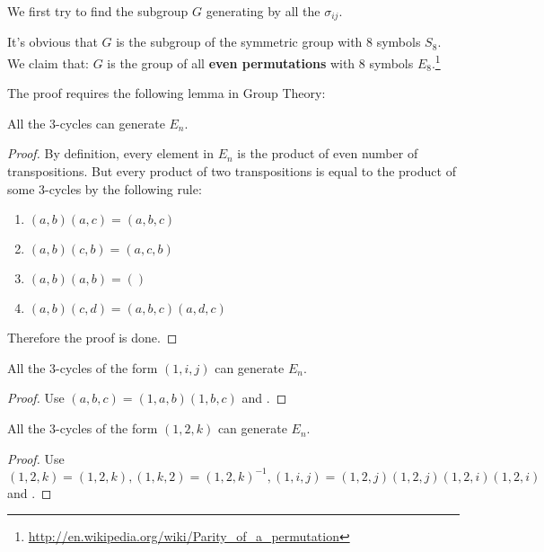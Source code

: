 We first try to find the subgroup $ G$ generating by all the $ \sigma_{ij}$.

It's obvious that $G$ is the subgroup of the symmetric group with 8 symbols $ S_8$.
We claim that: $G$ is the group of all \textbf{even permutations} with 8 symbols $ E_8$.\footnote{\url{http://en.wikipedia.org/wiki/Parity_of_a_permutation}}

The proof requires the following lemma in Group Theory:
\begin{lemma}
  \label{lemma:1}
  All the 3-cycles can generate $E_n$.
  \begin{proof}
    By definition, every element in $ E_n$ is the product of even number of transpositions.
    But every product of two transpositions is equal to the product of some 3-cycles by the following rule:
    \begin{enumerate}
      \item $ (a,b)(a,c) = (a,b,c)$
      \item $ (a,b)(c,b) = (a,c,b)$
      \item $(a,b)(a,b) = () $
      \item $(a,b)(c,d) = (a,b,c)(a,d,c) $
    \end{enumerate}
    Therefore the proof is done.
  \end{proof}
\end{lemma}

\begin{lemma}
  \label{lemma:2}
All the 3-cycles of the form $ (1,i,j)$ can generate $ E_n$.
\begin{proof}
  Use $(a,b,c) = (1,a,b)(1,b,c) $ and .
\end{proof}
\end{lemma}

\begin{lemma}
  \label{lemma:3}
All the 3-cycles of the form $ (1,2,k)$ can generate $ E_n$.
\begin{proof}
Use $ (1,2,k) = (1,2,k), (1,k,2) = (1,2,k)^{-1}, (1,i,j) = (1,2,j)(1,2,j)(1,2,i)(1,2,i)$ and .
\end{proof}
\end{lemma}

